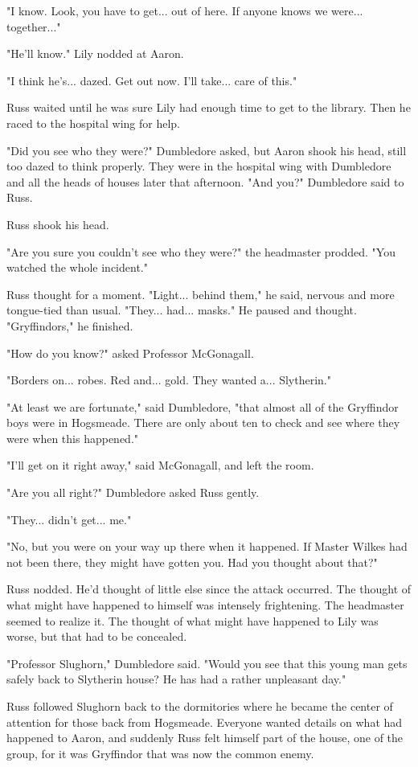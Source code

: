 \documentclass[a4paper,11pt]{article}
\begin{document}
"I know. Look, you have to get... out of here. If anyone knows we were... together..."

"He'll know." Lily nodded at Aaron.

"I think he's... dazed. Get out now. I'll take... care of this."

Russ waited until he was sure Lily had enough time to get to the library. Then he raced to the hospital wing for help.

"Did you see who they were?" Dumbledore asked, but Aaron shook his head, still too dazed to think properly. They were in the hospital wing with Dumbledore and all the heads of houses later that afternoon. "And you?" Dumbledore said to Russ.

Russ shook his head.

"Are you sure you couldn't see who they were?" the headmaster prodded. "You watched the whole incident."

Russ thought for a moment. "Light... behind them," he said, nervous and more tongue-tied than usual. "They... had... masks." He paused and thought. "Gryffindors," he finished.

"How do you know?" asked Professor McGonagall.

"Borders on... robes. Red and... gold. They wanted a... Slytherin."

"At least we are fortunate," said Dumbledore, "that almost all of the Gryffindor boys were in Hogsmeade. There are only about ten to check and see where they were when this happened."

"I'll get on it right away," said McGonagall, and left the room.

"Are you all right?" Dumbledore asked Russ gently.

"They... didn't get... me."

"No, but you were on your way up there when it happened. If Master Wilkes had not been there, they might have gotten you. Had you thought about that?"

Russ nodded. He'd thought of little else since the attack occurred. The thought of what might have happened to himself was intensely frightening. The headmaster seemed to realize it. The thought of what might have happened to Lily was worse, but that had to be concealed.

"Professor Slughorn," Dumbledore said. "Would you see that this young man gets safely back to Slytherin house? He has had a rather unpleasant day."

Russ followed Slughorn back to the dormitories where he became the center of attention for those back from Hogsmeade. Everyone wanted details on what had happened to Aaron, and suddenly Russ felt himself part of the house, one of the group, for it was Gryffindor that was now the common enemy.
\end{document}

